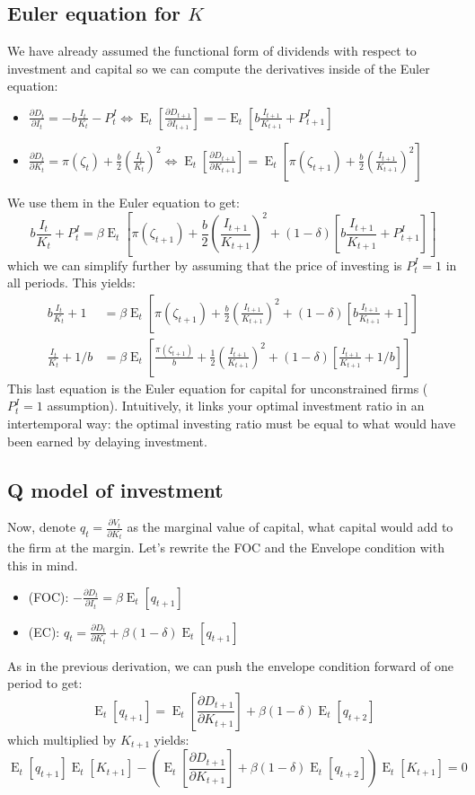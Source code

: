 \documentclass[12pt]{report}
\newcommand{\Et}[1]{\operatorname{E}_t\left[#1\right]}
\begin{document}
\subsection{Euler equation for $K$}

We have already assumed the functional form of dividends with respect to investment and capital so we can compute the derivatives inside of the Euler equation:\begin{itemize}
\item $\frac{\partial D_t}{\partial I_t} = - b \frac{I_t}{K_t} - P_t^I \Leftrightarrow \Et{\frac{\partial D_{t+1}}{\partial I_{t+1}}} = -\Et{b \frac{I_{t+1}}{K_{t+1}} + P_{t+1}^I} $
\item $\frac{\partial D_t}{\partial K_t} = \pi(\zeta_t) + \frac{b}{2}\left(\frac{I_t}{K_t}\right)^2 \Leftrightarrow \Et{\frac{\partial D_{t+1}}{\partial K_{t+1}}} = \Et{\pi(\zeta_{t+1}) + \frac{b}{2}\left(\frac{I_{t+1}}{K_{t+1}}\right)^2}$
\end{itemize}
We use them in the Euler equation to get: $$ b \frac{I_t}{K_t} + P_t^I = \beta\Et{ \pi(\zeta_{t+1}) + \frac{b}{2}\left(\frac{I_{t+1}}{K_{t+1}}\right)^2 + (1-\delta) \left[ b \frac{I_{t+1}}{K_{t+1}} + P_{t+1}^I\right] } $$ which we can simplify further by assuming that the price of investing is $P_t^I = 1$ in all periods. This yields:\begin{align*}
b \frac{I_t}{K_t} + 1 & = \beta\Et{ \pi(\zeta_{t+1}) + \frac{b}{2}\left(\frac{I_{t+1}}{K_{t+1}}\right)^2 + (1-\delta) \left[ b \frac{I_{t+1}}{K_{t+1}} + 1 \right] } \\
\frac{I_t}{K_t} + 1/b & = \beta\Et{ \frac{\pi(\zeta_{t+1})}{b} + \frac{1}{2}\left(\frac{I_{t+1}}{K_{t+1}}\right)^2 + (1-\delta) \left[\frac{I_{t+1}}{K_{t+1}} + 1/b \right] }
\end{align*} This last equation is the Euler equation for capital for unconstrained firms ($P_t^I = 1$ assumption). Intuitively, it links your optimal investment ratio in an intertemporal way: the optimal investing ratio must be equal to what would have been earned by delaying investment.

\subsection{Q model of investment}

Now, denote $q_t = \frac{\partial V_t}{\partial K_t}$ as the marginal value of capital, what capital would add to the firm at the margin. Let's rewrite the FOC and the Envelope condition with this in mind.\begin{itemize}
\item (FOC): $-\frac{\partial D_t}{\partial I_t} = \beta \Et{q_{t+1}} $
\item (EC): $q_t = \frac{\partial D_t}{\partial K_t} + \beta(1-\delta)\Et{q_{t+1}}$
\end{itemize} As in the previous derivation, we can push the envelope condition forward of one period to get: $$ \Et{q_{t+1}} = \Et{\frac{\partial D_{t+1}}{\partial K_{t+1}}} + \beta(1-\delta)\Et{q_{t+2}} $$ which multiplied by $K_{t+1}$ yields: $$ \Et{q_{t+1}}\Et{K_{t+1}} - \left(\Et{\frac{\partial D_{t+1}}{\partial K_{t+1}}} + \beta(1-\delta)\Et{q_{t+2}}\right)\Et{K_{t+1}} = 0 $$
\end{document}
